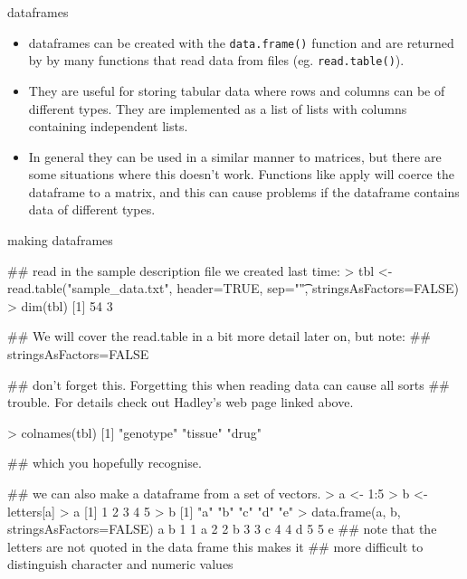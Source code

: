 \documentclass[pdf]{beamer}
\begin{document}
\begin{frame}[fragile]{dataframes}
  
  {\small
    \begin{itemize}
      \item dataframes can be created with the \texttt{data.frame()} function
        and are returned by by many functions that read data from files
        (eg. \texttt{read.table()}).
      \item They are useful for storing tabular data where rows and columns
        can be of different types. They are implemented as a list of lists
        with columns containing independent lists.
      \item  In general they can be used in a similar manner to matrices, but
        there are some situations where this doesn't work. Functions like
        apply will coerce the dataframe to a matrix, and this can cause problems
        if the dataframe contains data of different types.
      \end{itemize}
  }
\end{frame}

\begin{frame}[fragile]{making dataframes}

  \begin{rcode}
    ## read in the sample description file we created last time:
    > tbl <- read.table("sample_data.txt", header=TRUE, sep="\t", stringsAsFactors=FALSE)
    > dim(tbl)
    [1] 54  3
    
    ## We will cover the read.table in a bit more detail later on, but note:
    ## stringsAsFactors=FALSE
    
    ## don't forget this. Forgetting this when reading data can cause all sorts
    ## trouble. For details check out Hadley's web page linked above.

    > colnames(tbl)
    [1] "genotype" "tissue"   "drug"    

    ## which you hopefully recognise. 
    
    ## we can also make a dataframe from a set of vectors.
    > a <- 1:5
    > b <- letters[a]
    > a
    [1] 1 2 3 4 5
    > b
    [1] "a" "b" "c" "d" "e"
    > data.frame(a, b, stringsAsFactors=FALSE)
      a b
    1 1 a
    2 2 b
    3 3 c
    4 4 d
    5 5 e
    ## note that the letters are not quoted in the data frame this makes it
    ## more difficult to distinguish character and numeric values
  \end{rcode}
\end{frame}
\end{document}
